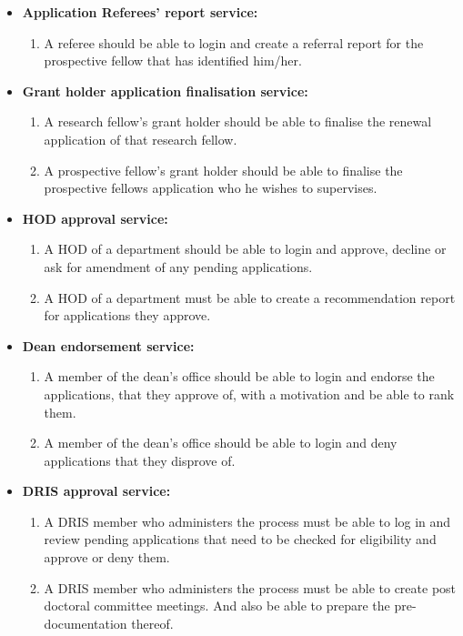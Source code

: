 \documentclass[12pt]{article}
\begin{document}
\begin{itemize}
\begin{enumerate}
		\end{enumerate}
		\item \textbf{Application Referees' report service:}
		\begin{enumerate}		
			\item A referee should be able to login and create a referral report for the prospective fellow that has identified him/her.				 					
		\end{enumerate}
		\item \textbf{Grant holder application finalisation service:}
		\begin{enumerate}		
			\item A research fellow's grant holder should be able to finalise the renewal application of that research fellow.
			\item A prospective fellow's grant holder should be able to finalise the prospective fellows application who he wishes to  supervises.				 					
		\end{enumerate}
		\item \textbf{HOD approval service:}
		\begin{enumerate}		
			\item A HOD of a department should be able to login and approve, decline or ask for amendment of any pending applications.
			\item A HOD of a department must be able to create a recommendation report for applications they approve.				 					
		\end{enumerate}
		\item \textbf{Dean endorsement service:}
		\begin{enumerate}		
			\item A member of the dean's office should be able to login and endorse the applications, that they approve of, with a motivation and be able to rank them.
			\item A member of the dean's office should be able to login and deny applications that they disprove of.				 					
		\end{enumerate}
		\item \textbf{DRIS approval service:}
		\begin{enumerate}		
			\item A DRIS member who administers the process must be able to log in and review pending applications that need to be checked for eligibility and approve or deny them.
			\item A DRIS member who administers the process must be able to create post doctoral committee meetings. And also be able to prepare the pre-documentation thereof.

\end{enumerate}
\end{itemize}
\end{document}
